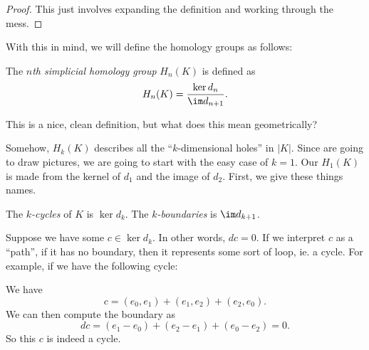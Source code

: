 \documentclass[a4paper]{article}
\begin{document}
\begin{proof}
  This just involves expanding the definition and working through the mess. %
\end{proof}

With this in mind, we will define the homology groups as follows:
\begin{defi}
  The \emph{$n$th simplicial homology group} $H_n(K)$ is defined as
  \[
    H_n(K) = \frac{\ker d_n}{\im d_{n + 1}}.
  \]
\end{defi}
This is a nice, clean definition, but what does this mean geometrically?

Somehow, $H_k(K)$ describes all the ``$k$-dimensional holes'' in $|K|$. Since are going to draw pictures, we are going to start with the easy case of $k = 1$. Our $H_1(K)$ is made from the kernel of $d_1$ and the image of $d_2$. First, we give these things names.

\begin{defi}
  The \emph{$k$-cycles} of $K$ is $\ker d_k$. The \emph{$k$-boundaries} is $\im d_{k + 1}$.
\end{defi}

Suppose we have some $c \in \ker d_k$. In other words, $dc = 0$. If we interpret $c$ as a ``path'', if it has no boundary, then it represents some sort of loop, ie. a cycle. For example, if we have the following cycle:
\begin{center}
\end{center}
We have
\[
  c = (e_0, e_1) + (e_1, e_2) + (e_2, e_0).
\]
We can then compute the boundary as
\[
  dc = (e_1 - e_0) + (e_2 - e_1) + (e_0 - e_2) = 0.
\]
So this $c$ is indeed a cycle.
\end{document}
